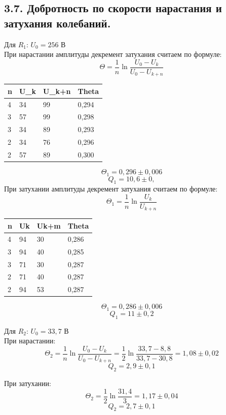 \documentclass[a4paper,12pt]{article}
\begin{document}
\subsection*{3.7. Добротность по скорости нарастания и затухания колебаний.}

Для $R_1$: $U_0 = 256$ В\\
При нарастании амплитуды декремент затухания считаем по формуле:
$$
\Theta = \frac{1}{n}\ln{\frac{U_0-U_k}{U_0-U_{k+n}}}
$$
\begin{table}[!ht]
    \centering
    \begin{tabular}{|l|l|l|l|}
    \hline
        n & U\_k & U\_k+n & Theta \\ \hline
        4 & 34 & 99 & 0,294 \\ \hline
        3 & 57 & 99 & 0,298 \\ \hline
        3 & 34 & 89 & 0,293 \\ \hline
        2 & 34 & 76 & 0,296 \\ \hline
        2 & 57 & 89 & 0,300 \\ \hline
    \end{tabular}
\end{table}
$$
\Theta_1 = 0,296 \pm 0,006
$$
$$
Q_1 = 10,6 \pm 0,
$$
При затухании амплитуды декремент затухания считаем по формуле:
$$
\Theta_1 = \frac{1}{n}\ln{\frac{U_k}{U_{k+n}}}
$$
\begin{table}[!ht]
    \centering
    \begin{tabular}{|l|l|l|l|}
    \hline
        n & Uk & Uk+m & Theta \\ \hline
        4 & 94 & 30 & 0,286 \\ \hline
        3 & 94 & 40 & 0,285 \\ \hline
        3 & 71 & 30 & 0,287 \\ \hline
        2 & 71 & 40 & 0,287 \\ \hline
        2 & 94 & 53 & 0,287 \\ \hline
    \end{tabular}
\end{table}

$$
\Theta_1 = 0,286 \pm 0,006
$$
$$
Q_1 = 11 \pm 0,2
$$

Для $R_2$: $U_0 = 33,7$ В\\
При нарастании:
$$
\Theta_2 = \frac{1}{n}\ln{\frac{U_0-U_k}{U_0-U_{k+n}}} = \frac{1}{2}\ln{\frac{33,7-8,8}{33,7-30,8}} = 1,08\pm0,02
$$
$$
Q_2 = 2,9\pm0,1
$$

При затухании:
$$
\Theta_2 = \frac{1}{2}\ln{\frac{31,4}{3}} = 1,17\pm0,04
$$
$$
Q_2 = 2,7\pm0,1
$$
\end{document}
